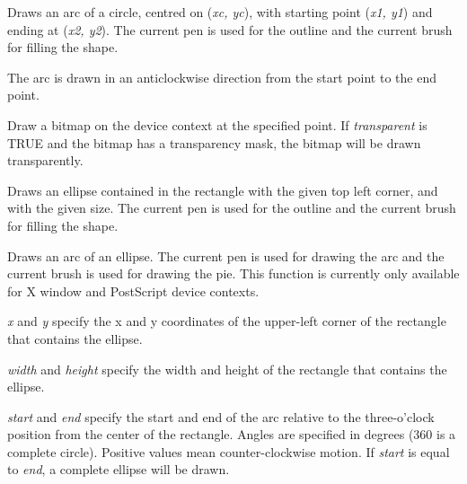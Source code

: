 \label{wxdcdrawarc}


Draws an arc of a circle, centred on ({\it xc, yc}), with starting point ({\it x1, y1})
and ending at ({\it x2, y2}).   The current pen is used for the outline
and the current brush for filling the shape.

The arc is drawn in an anticlockwise direction from the start point to the end point.

\label{wxdcdrawbitmap}


Draw a bitmap on the device context at the specified point. If {\it transparent} is TRUE and the bitmap has
a transparency mask, the bitmap will be drawn transparently.

\label{wxdcdrawellipse}


Draws an ellipse contained in the rectangle with the given top left corner, and with the
given size.  The current pen is used for the outline and the current brush for
filling the shape.

\label{wxdcdrawellipticarc}


Draws an arc of an ellipse. The current pen is used for drawing the arc and
the current brush is used for drawing the pie. This function is currently only available for
X window and PostScript device contexts.

{\it x} and {\it y} specify the x and y coordinates of the upper-left corner of the rectangle that contains
the ellipse.

{\it width} and {\it height} specify the width and height of the rectangle that contains
the ellipse.

{\it start} and {\it end} specify the start and end of the arc relative to the three-o'clock
position from the center of the rectangle. Angles are specified
in degrees (360 is a complete circle). Positive values mean
counter-clockwise motion. If {\it start} is equal to {\it end}, a
complete ellipse will be drawn.

